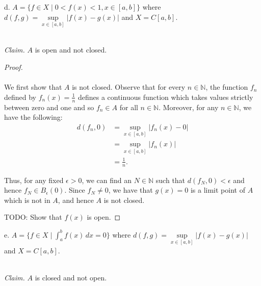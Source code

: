 \pagebreak

d.  $A = \{ f \in X \mid 0 < f(x) < 1, x \in [a, b] \}$ where $d(f, g) = \sup\limits_{x \in [a, b]}{|f(x) - g(x)|}$ and 
    $X = C[a, b]$.

\ \\
\emph{Claim.} $A$ is open and not closed. 

\begin{proof}\renewcommand{\qedsymbol}{}\ \\\\
    We first show that $A$ is not closed. Observe that for every $n \in \mathbb{N}$, the function $f_n$ defined by 
    $f_n(x) = \frac{1}{n}$ defines a continuous function which takes values strictly between zero and one and so 
    $f_n \in A$ for all $n \in \mathbb{N}$. Moreover, for any $n \in \mathbb{N}$, we have the following:
    \begin{align*}
         d(f_n, 0) &= \sup\limits_{x \in [a, b]}{|f_n(x) - 0|} \\ 
                   &= \sup\limits_{x \in [a, b]}{|f_n(x)|} \\ 
                   &= \frac{1}{n}.
    \end{align*}

    Thus, for any fixed $\epsilon > 0$, we can find an $N \in \mathbb{N}$ such that $d(f_N, 0) < \epsilon$ and hence
    $f_N \in B_\epsilon(0)$. Since $f_N \neq 0$, we have that $g(x) = 0$ is a limit point of $A$ which is not in $A$, 
    and hence $A$ is not closed.

    TODO: Show that $f(x)$ is open.
\end{proof}

\pagebreak

e.  $A = \{ f \in X \mid \int_a^b{f(x) \,dx} = 0 \}$ where $d(f, g) = \sup\limits_{x \in [a, b]}{|f(x) - g(x)|}$ and 
    $X = C[a, b]$.

\ \\
\emph{Claim.} $A$ is closed and not open.

